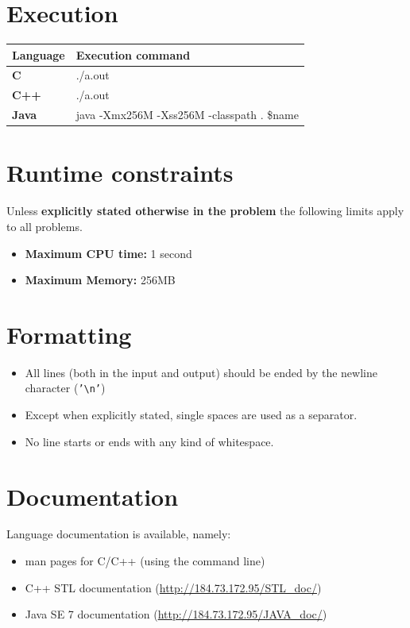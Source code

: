 \documentclass[11pt]{report}
\begin{document}
\section*{Execution}


\begin{tabular}{| l | l |}
\hline
\textbf{Language} & \textbf{Execution command} \\
\hline
\textbf{C} & ./a.out \\
\textbf{C++} & ./a.out \\
\textbf{Java} & java -Xmx256M -Xss256M -classpath . \$name \\
\hline
\end{tabular}

\section*{Runtime constraints}

Unless \textbf{explicitly stated otherwise in the problem} the following limits
apply to all problems.

\begin{itemize}
\item \textbf{Maximum CPU time:} 1 second
\item \textbf{Maximum Memory:} 256MB
\end{itemize}

\section*{Formatting}

\begin{itemize}
\item All lines (both in the input and output) should be ended by the newline
  character (\texttt{'\textbackslash n'})
\item Except when explicitly stated, single spaces are used as a separator.
\item No line starts or ends with any kind of whitespace.
\end{itemize}

\section*{Documentation}

Language documentation is available, namely:
\begin{itemize}
\item man pages for C/C++ (using the command line)
\item C++ STL documentation (\url{http://184.73.172.95/STL_doc/})
\item Java SE 7 documentation (\url{http://184.73.172.95/JAVA_doc/})
\end{itemize}
\end{document}
